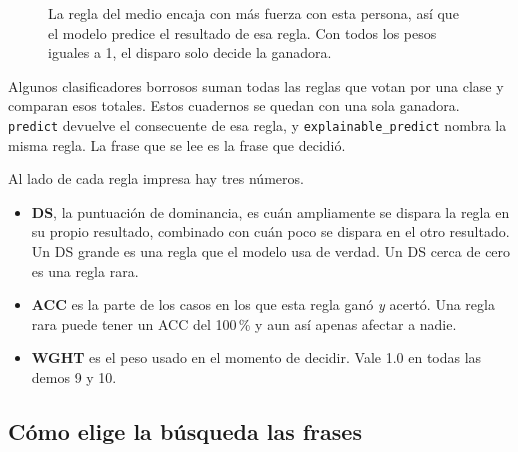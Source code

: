 \documentclass[11pt]{article}
\newcommand{\fn}[1]{\texttt{\small #1}}
\begin{document}
\begin{figure}[H]
\centering
{}
\caption{La regla del medio encaja con más fuerza con esta persona, así que el modelo predice el resultado de esa regla. Con todos los pesos iguales a 1, el disparo solo decide la ganadora.}
\end{figure}

Algunos clasificadores borrosos suman todas las reglas que votan por una clase y comparan esos totales. Estos cuadernos se quedan con una sola ganadora. \fn{predict} devuelve el consecuente de esa regla, y \fn{explainable\_predict} nombra la misma regla. La frase que se lee es la frase que decidió.

Al lado de cada regla impresa hay tres números.

\begin{itemize}
  \item \textbf{DS}, la puntuación de dominancia, es cuán ampliamente se dispara la regla en su propio resultado, combinado con cuán poco se dispara en el otro resultado. Un DS grande es una regla que el modelo usa de verdad. Un DS cerca de cero es una regla rara.
  \item \textbf{ACC} es la parte de los casos en los que esta regla ganó \emph{y} acertó. Una regla rara puede tener un ACC del 100\,\% y aun así apenas afectar a nadie.
  \item \textbf{WGHT} es el peso usado en el momento de decidir. Vale 1.0 en todas las demos 9 y 10.
\end{itemize}

\subsection{Cómo elige la búsqueda las frases}
\label{sec:search}
\end{document}
